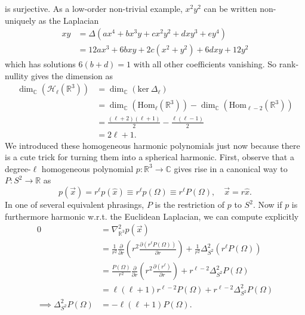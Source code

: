 \documentclass[11pt,letterpaper]{article}
\newcommand{\LP}{\left(}
\newcommand{\RP}{\right)}
\newcommand{\mc}[1]{\mathcal{#1}}
\newcommand{\R}{\mathbb{R}}
\newcommand{\C}{\mathbb{C}}
\newcommand{\PA}[2]{\frac{\partial #1}{\partial #2}}
\begin{document}
is surjective. As a low-order non-trivial example, $x^2 y^2$ can be written non-uniquely as the Laplacian \begin{equation}
\begin{aligned}
xy & = \Delta \LP a x^4 + b x^3 y + c x^2 y^2 + d x y^3 + e y^4 \RP \\
& = 12 a x^3 + 6 b x y + 2 c (x^2 + y^2) + 6 d xy + 12 y^2
\end{aligned}
\end{equation}
which has solutions $6(b+d) = 1$ with all other coefficients vanishing. So rank-nullity gives the dimension as \begin{equation}
\begin{aligned}
\dim_\C \LP \mc{H}_\ell(\R^3) \RP & = \dim_\C \LP \mbox{ker} \ \Delta_\ell \RP \\
& = \dim_\C \LP \mbox{Hom}_\ell(\R^3) \RP - \dim_\C \LP \mbox{Hom}_{\ell - 2} (\R^3) \RP \\
& = \frac{(\ell + 2)(\ell + 1)}{2} - \frac{\ell(\ell - 1)}{2} \\
& = 2 \ell + 1.
\end{aligned}
\end{equation}
We introduced these homogeneous harmonic polynomials just now because there is a cute trick for turning them into a spherical harmonic. First, observe that a degree-$\ell$ homogeneous polynomial $p: \R^3 \to \C$ gives rise in a canonical way to $P: S^2 \to \R$ as \begin{equation}
p(\vec{x}) = r^\ell p(\hat{x}) \equiv r^\ell p(\Omega) \equiv r^\ell P(\Omega) , \quad \vec{x} = r \hat{x}.
\end{equation}
In one of several equivalent phrasings, $P$ is the restriction of $p$ to $S^2$. Now if $p$ is furthermore harmonic w.r.t. the Euclidean Laplacian, we can compute explicitly \begin{equation}
\begin{aligned}
0 & = \nabla^2_{\R^3} p (\vec{x}) \\
& = \frac{1}{r^2} \PA{}{r} \LP r^2 \PA{(r^\ell P(\Omega))}{r} \RP + \frac{1}{r^2} \Delta^2_{S^2} (r^\ell P(\Omega)) \\
& = \frac{P(\Omega)}{r^2} \PA{}{r} \LP r^2 \PA{(r^\ell )}{r} \RP + r^{\ell - 2} \Delta^2_{S^2} P(\Omega) \\
& = \ell (\ell + 1) r^{\ell - 2} P(\Omega) + r^{\ell - 2} \Delta^2_{S^2} P(\Omega) \\
\implies \Delta^2_{S^2} P(\Omega) & = - \ell (\ell + 1) P(\Omega).
\end{aligned}
\end{equation}
\end{document}
